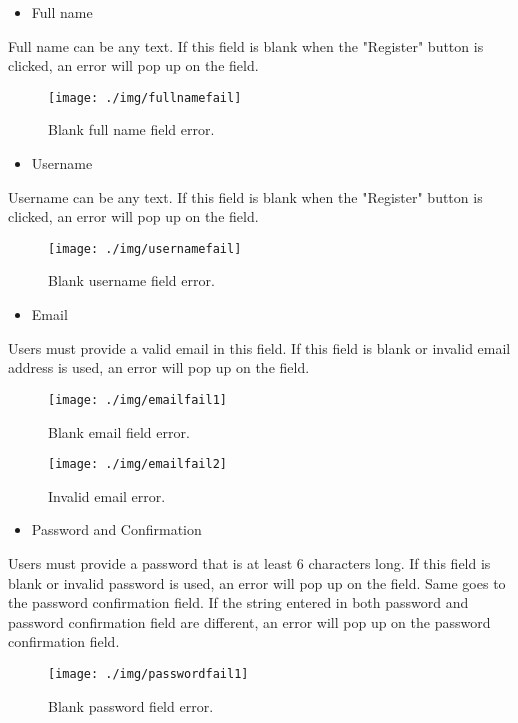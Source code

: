 \documentclass[conference]{IEEEtran}
\begin{document}
\begin{itemize}
\item Full name
\end{itemize}
Full name can be any text. If this field is blank when the "Register" button is clicked, an error will pop up on the field. 
\begin{figure}[h!]
\texttt{[image: ./img/fullnamefail]}
\centering
\caption{Blank full name field error.}
\end{figure}

\begin{itemize}
\item Username
\end{itemize}
Username can be any text. If this field is blank when the "Register" button is clicked, an error will pop up on the field. 
\begin{figure}[h!]
\texttt{[image: ./img/usernamefail]}
\centering
\caption{Blank username field error.}
\end{figure}

\begin{itemize}
\item Email
\end{itemize}
Users must provide a valid email in this field. If this field is blank or invalid email address is used, an error will pop up on the field. \\

\begin{figure}[h!]
\texttt{[image: ./img/emailfail1]}
\centering
\caption{Blank email field error.}
\end{figure}

\begin{figure}[h!]
\texttt{[image: ./img/emailfail2]}
\centering
\caption{Invalid email error.}
\end{figure}

\begin{itemize}
\item Password and Confirmation
\end{itemize}
Users must provide a password that is at least 6 characters long. If this field is blank or invalid password is used, an error will pop up on the field. Same goes to the password confirmation field. If the string entered in both password and password confirmation field are different, an error will pop up on the password confirmation field.

\begin{figure}[h!]
\texttt{[image: ./img/passwordfail1]}
\centering
\caption{Blank password field error.}
\end{figure}
\end{document}
